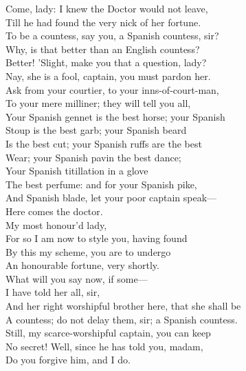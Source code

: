 \documentclass[a4paper,oneside]{memoir}
\begin{document}
\begin{drama*}
\facespeaks Come, lady: I knew the Doctor would not leave,\\
Till he had found the very nick of her fortune.\\
\kastrilspeaks To be a countess, say you, a Spanish countess, sir?\\
\pliantspeaks Why, is that better than an English countess?\\
\facespeaks Better! 'Slight, make you that a question, lady?\\
\kastrilspeaks Nay, she is a fool, captain, you must pardon her.\\
\facespeaks Ask from your courtier, to your inns-of-court-man,\\
To your mere milliner; they will tell you all,\\
Your Spanish gennet is the best horse; your Spanish\\
Stoup is the best garb; your Spanish beard\\
Is the best cut; your Spanish ruffs are the best\\
Wear; your Spanish pavin the best dance;\\
Your Spanish titillation in a glove\\
The best perfume: and for your Spanish pike,\\
And Spanish blade, let your poor captain speak---\\
Here comes the doctor.\\
\subtlespeaks {} My most honour'd lady,\\
For so I am now to style you, having found\\
By this my scheme, you are to undergo\\
An honourable fortune, very shortly.\\
What will you say now, if some---\\
\facespeaks {} I have told her all, sir,\\
And her right worshipful brother here, that she shall be\\
A countess; do not delay them, sir; a Spanish countess.\\
\subtlespeaks Still, my scarce-worshipful captain, you can keep\\
No secret! Well, since he has told you, madam,\\
Do you forgive him, and I do.\\

\end{drama*}
\end{document}
